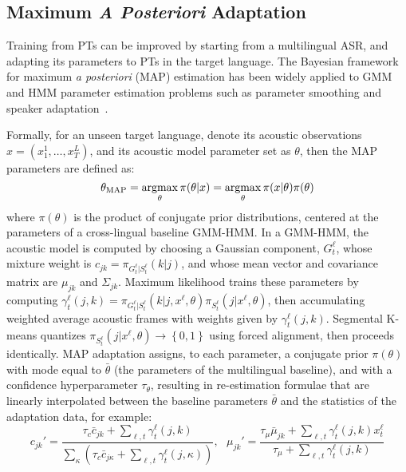 \subsection{Maximum {\em A Posteriori} Adaptation}
\label{sec:adaptation}

Training from PTs can be improved by starting from a multilingual ASR,
and adapting its parameters to PTs in the target language.  The
Bayesian framework for maximum {\em a posteriori} (MAP) estimation
has been widely applied to GMM and HMM parameter estimation problems
such as parameter smoothing and speaker
adaptation~\cite{gauvain1994maximum}.

Formally, for an unseen target language, denote its acoustic
observations $x = ( x_1^1, \ldots, x_{T}^L )$, and its acoustic model
parameter set as $\theta$, then the MAP parameters are defined as:
\begin{equation}
  \theta_{\mathrm{MAP}}  = \argmax_{\theta} \pi(\theta | x) 
= \argmax_{\theta} \pi( x | \theta ) \pi(\theta)
\label{eq:map}
\end{equation}
\noindent where $\pi(\theta)$ is the product of conjugate
prior distributions, centered at the parameters of a cross-lingual
baseline GMM-HMM.  In a GMM-HMM, the acoustic model 
is computed by choosing a Gaussian component, $G_t^\ell$, whose mixture
weight is $c_{jk}=\pi_{G_t^{\ell}|S_t^{\ell}}(k|j)$, and whose mean vector
and covariance matrix are $\mu_{jk}$ and $\Sigma_{jk}$.  Maximum
likelihood trains these parameters by computing
$\gamma^{\ell}_t(j,k)=\pi_{G_t^{\ell}|S_t^{\ell}}(k|j,x^\ell,\theta)\pi_{S_t^{\ell}}(j|x^\ell,\theta)$,
then accumulating weighted average acoustic frames with weights given
by $\gamma_{t}^\ell(j,k)$. Segmental K-means quantizes
$\pi_{S_t^\ell}(j|x^\ell,\theta)\rightarrow\left\{0,1\right\}$ using forced
alignment, then proceeds identically.  MAP adaptation assigns, to each
parameter, a conjugate prior $\pi(\theta)$ with mode equal to
$\bar\theta$ (the parameters of the multilingual baseline), and with a
confidence hyperparameter $\tau_\theta$, resulting in re-estimation
formulae that are linearly interpolated between the baseline
parameters $\bar\theta$ and the statistics of the adaptation data, for
example:
\[
c_{jk}'=\frac{\tau_c\bar{c}_{jk}+\sum_{\ell,t}\gamma_{t}^\ell(j,k)}
{\sum_{\kappa}\left(\tau_c\bar{c}_{j\kappa}+
  \sum_{\ell,t}\gamma_{t}^\ell(j,\kappa)\right)},~~~
\mu_{jk}'=\frac{\tau_\mu\bar{\mu}_{jk}+\sum_{\ell,t}\gamma_{t}^\ell(j,k)x_t^\ell}
   {\tau_\mu+\sum_{\ell,t}\gamma_{t}^\ell(j,k)}
\]


